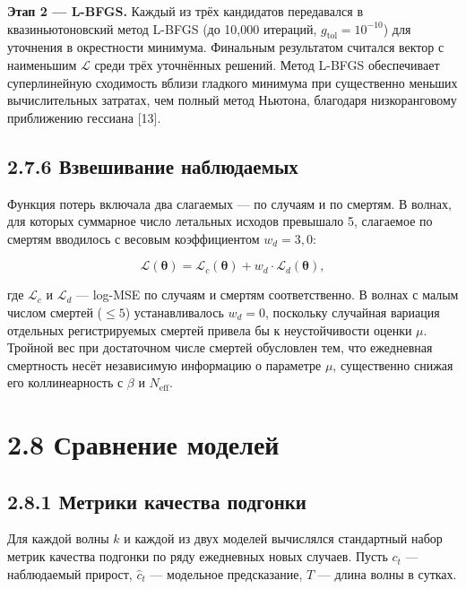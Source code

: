 \documentclass[12pt]{article}
\begin{document}
\textbf{Этап 2 --- L-BFGS.} Каждый из трёх кандидатов передавался в
квазиньютоновский метод L-BFGS (до 10,000 итераций,
\(g_{\text{tol}} = 10^{-10}\)) для уточнения в окрестности минимума.
Финальным результатом считался вектор с наименьшим \(\mathcal{L}\) среди
трёх уточнённых решений. Метод L-BFGS обеспечивает суперлинейную
сходимость вблизи гладкого минимума при существенно меньших
вычислительных затратах, чем полный метод Ньютона, благодаря
низкоранговому приближению гессиана {[}13{]}.

\subsection{2.7.6 Взвешивание
наблюдаемых}\label{ux432ux437ux432ux435ux448ux438ux432ux430ux43dux438ux435-ux43dux430ux431ux43bux44eux434ux430ux435ux43cux44bux445}

Функция потерь включала два слагаемых --- по случаям и по смертям. В
волнах, для которых суммарное число летальных исходов превышало 5,
слагаемое по смертям вводилось с весовым коэффициентом \(w_d = 3{,}0\):

\[\mathcal{L}(\boldsymbol{\theta}) = \mathcal{L}_c(\boldsymbol{\theta}) + w_d \cdot \mathcal{L}_d(\boldsymbol{\theta}),\]

где \(\mathcal{L}_c\) и \(\mathcal{L}_d\) --- log-MSE по случаям и
смертям соответственно. В волнах с малым числом смертей (\(\leq 5\))
устанавливалось \(w_d = 0\), поскольку случайная вариация отдельных
регистрируемых смертей привела бы к неустойчивости оценки \(\mu\).
Тройной вес при достаточном числе смертей обусловлен тем, что ежедневная
смертность несёт независимую информацию о параметре \(\mu\), существенно
снижая его коллинеарность с \(\beta\) и \(N_{\text{eff}}\).

\section{2.8 Сравнение
моделей}\label{ux441ux440ux430ux432ux43dux435ux43dux438ux435-ux43cux43eux434ux435ux43bux435ux439}

\subsection{2.8.1 Метрики качества
подгонки}\label{ux43cux435ux442ux440ux438ux43aux438-ux43aux430ux447ux435ux441ux442ux432ux430-ux43fux43eux434ux433ux43eux43dux43aux438}

Для каждой волны \(k\) и каждой из двух моделей вычислялся стандартный
набор метрик качества подгонки по ряду ежедневных новых случаев. Пусть
\(c_t\) --- наблюдаемый прирост, \(\hat{c}_t\) --- модельное
предсказание, \(T\) --- длина волны в сутках.
\end{document}
